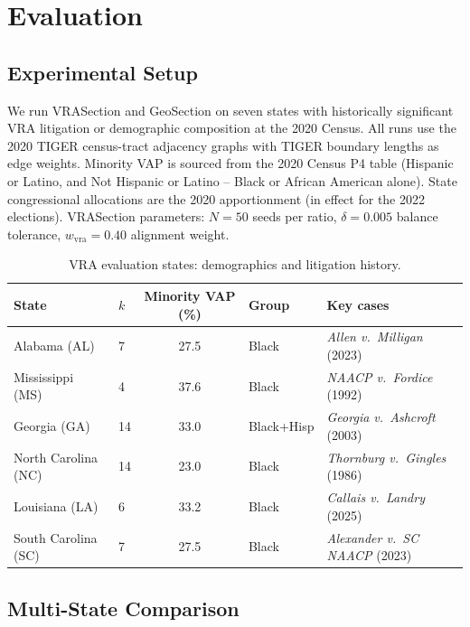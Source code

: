 \section{Evaluation}
\label{sec:evaluation}

\subsection{Experimental Setup}

We run VRASection and GeoSection on seven states with historically significant
VRA litigation or demographic composition at the 2020 Census.
All runs use the 2020 TIGER census-tract adjacency graphs with TIGER boundary
lengths as edge weights.
Minority VAP is sourced from the 2020 Census P4 table (Hispanic or Latino,
and Not Hispanic or Latino -- Black or African American alone).
State congressional allocations are the 2020 apportionment (in effect for
the 2022 elections).
VRASection parameters: $N = 50$ seeds per ratio, $\delta = 0.005$ balance
tolerance, $w_\text{vra} = 0.40$ alignment weight.

\begin{table}[t]
\centering
\caption{VRA evaluation states: demographics and litigation history.}
\label{tab:states}
\begin{tabular}{llcll}
\toprule
\textbf{State} & \textbf{$k$} & \textbf{Minority VAP (\%)} & \textbf{Group} & \textbf{Key cases} \\
\midrule
Alabama (AL) & 7  & 27.5 & Black      & \emph{Allen v.\ Milligan} (2023) \\
Mississippi (MS) & 4 & 37.6 & Black   & \emph{NAACP v.\ Fordice} (1992) \\
Georgia (GA) & 14 & 33.0 & Black+Hisp & \emph{Georgia v.\ Ashcroft} (2003) \\
North Carolina (NC) & 14 & 23.0 & Black & \emph{Thornburg v.\ Gingles} (1986) \\
Louisiana (LA) & 6 & 33.2 & Black     & \emph{Callais v.\ Landry} (2025) \\
South Carolina (SC) & 7 & 27.5 & Black & \emph{Alexander v.\ SC NAACP} (2023) \\
\bottomrule
\end{tabular}
\end{table}

\subsection{Multi-State Comparison}

